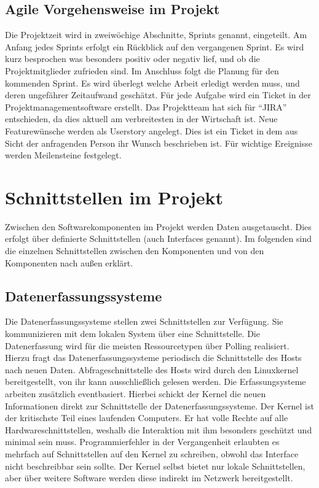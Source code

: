 \subsection{Agile Vorgehensweise im Projekt}
\label{subsec:agile_vorgehensweise}
Die Projektzeit wird in zweiwöchige Abschnitte, Sprints genannt, eingeteilt. Am
Anfang jedes Sprints erfolgt ein Rückblick auf den vergangenen Sprint. Es wird
kurz besprochen was besonders positiv oder negativ lief, und ob die
Projektmitglieder zufrieden sind. Im Anschluss folgt die Planung für den
kommenden Sprint. Es wird überlegt welche Arbeit erledigt werden muss, und
deren ungefährer Zeitaufwand geschätzt. Für jede Aufgabe wird ein Ticket in
der Projektmanagementsoftware erstellt. Das Projektteam hat sich für ``JIRA''
entschieden, da dies aktuell am verbreitesten in der Wirtschaft ist. Neue
Featurewünsche werden als Userstory angelegt. Dies ist ein Ticket in dem aus
Sicht der anfragenden Person ihr Wunsch beschrieben ist. Für wichtige
Ereignisse werden Meilensteine festgelegt.
\tm%

\section{Schnittstellen im Projekt}
Zwischen den Softwarekomponenten im Projekt werden Daten ausgetauscht. Dies
erfolgt über definierte Schnittstellen (auch Interfaces genannt). Im folgenden
sind die einzelnen Schnittstellen zwischen den Komponenten und von den
Komponenten nach außen erklärt.
\tm%

\subsection{Datenerfassungssysteme}
Die Datenerfassungssysteme stellen zwei Schnittstellen zur Verfügung. Sie
kommunizieren mit dem lokalen System über eine
 Schnittstelle. Die Datenerfassung wird
für die meisten Ressourcetypen über Polling realisiert. Hierzu fragt das
Datenerfassungssysteme periodisch die Schnittstelle des Hosts nach neuen Daten.
Abfrageschnittstelle des Hosts wird durch den Linuxkernel bereitgestellt, von
ihr kann ausschließlich gelesen werden. Die Erfassungsysteme arbeiten
zusätzlich eventbasiert. Hierbei schickt der Kernel die neuen Informationen
direkt zur Schnittstelle der Datenerfassungssysteme. Der Kernel ist der
kritischste Teil eines laufenden Computers. Er hat volle Rechte auf alle
Hardwareschnittstellen, weshalb die Interaktion mit ihm besonders geschützt und
minimal sein muss. Programmierfehler in der Vergangenheit erlaubten es mehrfach
auf Schnittstellen auf den Kernel zu schreiben, obwohl das Interface nicht
beschreibbar sein sollte. Der Kernel selbst bietet nur lokale Schnittstellen,
aber über weitere Software werden diese indirekt im Netzwerk bereitgestellt.

